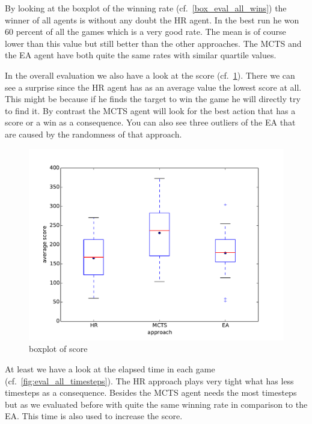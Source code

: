 By looking at the boxplot of the winning rate (cf.~\cref{box_eval_all_wins}) the winner of all agents is without any doubt
the \ac{HR} agent. In the best run he won 60 percent of all the games which is a very good rate.
The mean is of course lower than this value but still better than the other approaches.
The \ac{MCTS} and the \ac{EA} agent have both quite the same rates with similar quartile values.

In the overall evaluation we also have a look at the score (cf.~\cref{fig:eval_all_score}). There we can see a surprise since the \ac{HR} agent
has as an average value the lowest score at all. This might be because if he finds the target to win the game 
he will directly try to find it.
By contrast the \ac{MCTS} agent will look for the best action that has a score or a win as a consequence.
You can also see three outliers of the \ac{EA} that are caused by the randomness of that approach.


\begin{figure}[H]
\centering
\includegraphics[scale=0.45]{images/eval_all_score.pdf}
\caption{boxplot of score}
\label{fig:eval_all_score}
\end{figure}

At least we have a look at the elapsed time in each game (cf.~\cref{fig:eval_all_timesteps}). The \ac{HR} approach plays very tight what has less timesteps as a consequence.
Besides the \ac{MCTS} agent needs the most timesteps but as we evaluated before with quite the same winning rate in comparison to the \ac{EA}.
This time is also used to increase the score.


